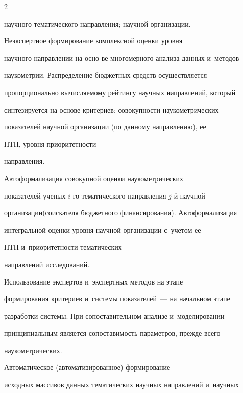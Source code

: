\begin{multicols}{2}
\begin{description}
научного тематического на\-прав\-ле\-ния; научной организации.

    

 \item[B.] Неэкспертное формирование комплексной оценки уровня 

научного направлении на осно-\linebreak ве многомерного анализа данных и~методов 

наукометрии. Распределение бюджетных средств осуществляется 

пропорционально вы\-чис\-ля\-емо\-му рейтингу научных на\-прав\-ле\-ний, который 

синтезируется на основе критериев: со\-во\-куп\-ности наукометрических 

показателей научной организации (по данному направлению), ее  

НТП, уровня приоритетности 

на\-прав\-ле\-ния.

    

     \item[C.] Автоформализация совокупной оценки наукометрических 

показателей ученых $i$-го темати\-че\-ско\-го направления $j$-й научной 

организации\linebreak (соискателя бюджетного финансирования). Автоформализация 

интегральной оценки уровня научной организации с~учетом ее  

НТП и~приоритетности тематических 

на\-прав\-ле\-ний исследований.

    

    \item[D.] Использование экспертов и~экспертных методов на этапе 

формирования критериев и~сис\-те\-мы показателей~--- на начальном этапе 

разработки сис\-те\-мы. При сопоставительном анализе и~моделировании 

принципиальным является сопоставимость параметров, прежде всего 

наукометрических.

    

     \item[E.] Автоматическое (автоматизированное) формирование 

исходных массивов данных тема\-тических научных на\-прав\-ле\-ний и~научных 


\end{description}
\end{multicols}
